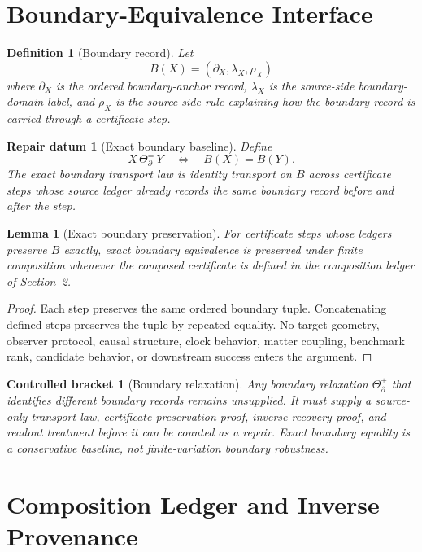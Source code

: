 \documentclass[11pt]{article}
\newtheorem{definition}{Definition}
\newtheorem{repair}{Repair datum}
\newtheorem{bracket}{Controlled bracket}
\newtheorem{lemma}{Lemma}
\begin{document}
\section{Boundary-Equivalence Interface}

\begin{definition}[Boundary record]
Let
\[
B(X)=(\partial_X,\lambda_X,\rho_X)
\]
where \(\partial_X\) is the ordered boundary-anchor record,
\(\lambda_X\) is the source-side boundary-domain label, and \(\rho_X\)
is the source-side rule explaining how the boundary record is carried
through a certificate step.
\end{definition}

\begin{repair}[Exact boundary baseline]
Define
\[
X \,\Theta_{\partial}^{=}\, Y
\quad\Longleftrightarrow\quad
B(X)=B(Y).
\]
The exact boundary transport law is identity transport on \(B\) across
certificate steps whose source ledger already records the same
boundary record before and after the step.
\end{repair}

\begin{lemma}[Exact boundary preservation]
For certificate steps whose ledgers preserve \(B\) exactly, exact
boundary equivalence is preserved under finite composition whenever
the composed certificate is defined in the composition ledger of
Section~\ref{sec:composition}.
\end{lemma}

\begin{proof}
Each step preserves the same ordered boundary tuple. Concatenating
defined steps preserves the tuple by repeated equality. No target
geometry, observer protocol, causal structure, clock behavior, matter
coupling, benchmark rank, candidate behavior, or downstream success
enters the argument.
\end{proof}

\begin{bracket}[Boundary relaxation]
Any boundary relaxation \(\Theta_{\partial}^{+}\) that identifies
different boundary records remains unsupplied. It must supply a
source-only transport law, certificate preservation proof, inverse
recovery proof, and readout treatment before it can be counted as a
repair. Exact boundary equality is a conservative baseline, not
finite-variation boundary robustness.
\end{bracket}

\section{Composition Ledger and Inverse Provenance}
\label{sec:composition}
\end{document}
